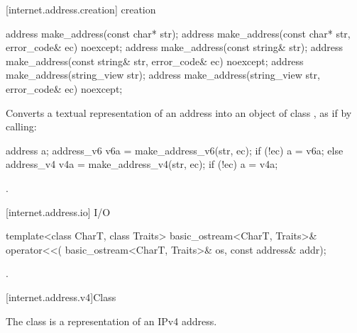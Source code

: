 [internet.address.creation]{ creation}

%
\begin{itemdecl}
address make_address(const char* str);
address make_address(const char* str, error_code& ec) noexcept;
address make_address(const string& str);
address make_address(const string& str, error_code& ec) noexcept;
address make_address(string_view str);
address make_address(string_view str, error_code& ec) noexcept;
\end{itemdecl}

\begin{itemdescr}
\pnum
\effects Converts a textual representation of an address into an object of class , as if by calling:
\begin{codeblock}
address a;
address_v6 v6a = make_address_v6(str, ec);
if (!ec)
  a = v6a;
else
{
  address_v4 v4a = make_address_v4(str, ec);
  if (!ec)
    a = v4a;
}
\end{codeblock}


\pnum
\returns {}.
\end{itemdescr}



[internet.address.io]{ I/O}

%
\begin{itemdecl}
template<class CharT, class Traits>
  basic_ostream<CharT, Traits>& operator<<(
    basic_ostream<CharT, Traits>& os, const address& addr);
\end{itemdecl}

\begin{itemdescr}
\pnum
\returns {}.
\end{itemdescr}




[internet.address.v4]{Class }

\pnum
The class  is a representation of an IPv4 address.

